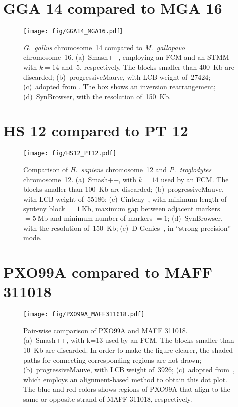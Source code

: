 \documentclass[a4paper,9pt]{extarticle}
\begin{document}
\section{GGA 14 compared to MGA 16}
\begin{figure}[!h]
  \centering
  \texttt{[image: fig/GGA14\_MGA16.pdf]}
  \caption{\textit{G.~gallus} chromosome~14 compared to \textit{M.~gallopavo} chromosome~16.
   (a)~Smash++, employing an FCM and an STMM with $k=14$ and~5, respectively. The blocks smaller than 400~Kb are discarded;
   (b)~progressiveMauve, with LCB weight of~27424;
   (c)~adopted from \cite{zhang2011comparative}. The box shows an inversion rearrangement; 
   (d)~SynBrowser, with the resolution of~150~Kb.
  }
  \label{fig.supp.GGA14.MGA16}
\end{figure}

\clearpage
\section{HS 12 compared to PT 12}
\begin{figure}[!h]
  \centering
  \texttt{[image: fig/HS12\_PT12.pdf]}
  \caption{Comparison of \textit{H.~sapiens} chromosome~12 and \textit{P.~troglodytes} chromosome~12.
   (a)~Smash++, with $k=14$ used by an FCM. The blocks smaller than 100~Kb are discarded;
   (b)~progressiveMauve, with LCB weight of~55186;
   (c)~Cinteny~\cite{sinha2007cinteny}, with minimum length of synteny block $=1~$Kb, maximum gap between adjacent markers $=5~$Mb and minimum number of markers $=1$;
   (d)~SynBrowser, with the resolution of~150~Kb;
   (e)~D-Genies~\cite{cabanettes2018d}, in ``strong precision'' mode.
  }
  \label{fig.supp.HS12.PT12}
\end{figure}

\clearpage
\section{PXO99A compared to MAFF 311018}
\begin{figure}[!h]
  \centering
  \texttt{[image: fig/PXO99A\_MAFF311018.pdf]}
    \caption{Pair-wise comparison of PXO99A and MAFF 311018.
     (a)~Smash++, with k=13 used by an FCM. The blocks smaller than 10~Kb are discarded. In order to make the figure clearer, the shaded paths for connecting corresponding regions are not drawn;
     (b)~progressiveMauve, with LCB weight of~3926;
     (c)~adopted from~\cite{salzberg2008genome}, which employs an alignment-based method to obtain this dot plot. The blue and red colors shows regions of PXO99A that align to the same or opposite strand of MAFF 311018, respectively.
    }
    \label{fig.supp.PXO99A.MAFF_311018}
\end{figure}
\end{document}
